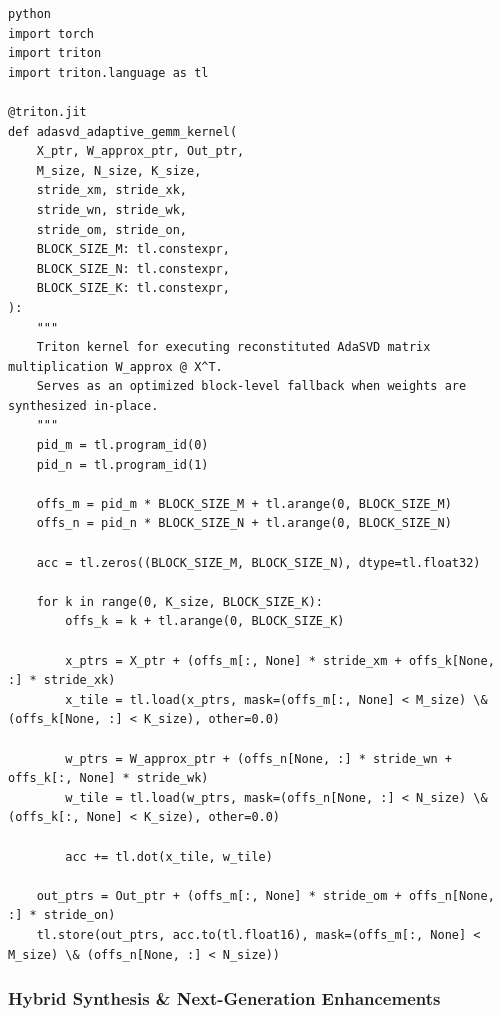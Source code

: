 \vspace{0.5em}
\begin{mdframed}[backgroundcolor=codebg, linecolor=codeframe, linewidth=1pt, roundcorner=4pt, innerleftmargin=2pt, innerrightmargin=5pt, innertopmargin=5pt, innerbottommargin=5pt]
\begin{lstlisting}
python
import torch
import triton
import triton.language as tl

@triton.jit
def adasvd_adaptive_gemm_kernel(
    X_ptr, W_approx_ptr, Out_ptr,
    M_size, N_size, K_size,
    stride_xm, stride_xk,
    stride_wn, stride_wk,
    stride_om, stride_on,
    BLOCK_SIZE_M: tl.constexpr,
    BLOCK_SIZE_N: tl.constexpr,
    BLOCK_SIZE_K: tl.constexpr,
):
    """
    Triton kernel for executing reconstituted AdaSVD matrix multiplication W_approx @ X^T.
    Serves as an optimized block-level fallback when weights are synthesized in-place.
    """
    pid_m = tl.program_id(0)
    pid_n = tl.program_id(1)

    offs_m = pid_m * BLOCK_SIZE_M + tl.arange(0, BLOCK_SIZE_M)
    offs_n = pid_n * BLOCK_SIZE_N + tl.arange(0, BLOCK_SIZE_N)

    acc = tl.zeros((BLOCK_SIZE_M, BLOCK_SIZE_N), dtype=tl.float32)

    for k in range(0, K_size, BLOCK_SIZE_K):
        offs_k = k + tl.arange(0, BLOCK_SIZE_K)

        x_ptrs = X_ptr + (offs_m[:, None] * stride_xm + offs_k[None, :] * stride_xk)
        x_tile = tl.load(x_ptrs, mask=(offs_m[:, None] < M_size) \& (offs_k[None, :] < K_size), other=0.0)

        w_ptrs = W_approx_ptr + (offs_n[None, :] * stride_wn + offs_k[:, None] * stride_wk)
        w_tile = tl.load(w_ptrs, mask=(offs_n[None, :] < N_size) \& (offs_k[:, None] < K_size), other=0.0)

        acc += tl.dot(x_tile, w_tile)

    out_ptrs = Out_ptr + (offs_m[:, None] * stride_om + offs_n[None, :] * stride_on)
    tl.store(out_ptrs, acc.to(tl.float16), mask=(offs_m[:, None] < M_size) \& (offs_n[None, :] < N_size))
\end{lstlisting}
\end{mdframed}
\vspace{0.5em}


\subsubsection*{Hybrid Synthesis \& Next-Generation Enhancements}

